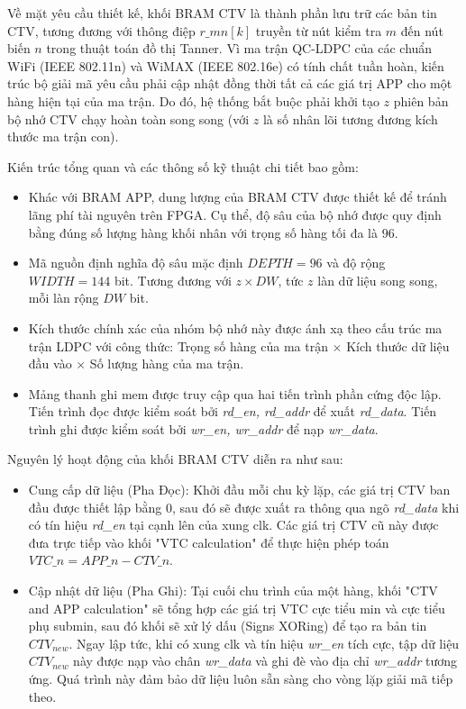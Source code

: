 \documentclass[12pt,a4paper,oneside]{book}
\begin{document}
Về mặt yêu cầu thiết kế, khối BRAM CTV là thành phần lưu trữ các bản tin CTV, tương đương với thông điệp $r\_{mn}[k]$ truyền từ nút kiểm tra $m$ đến nút biến $n$ trong thuật toán đồ thị Tanner. Vì ma trận QC-LDPC của các chuẩn WiFi (IEEE 802.11n) và WiMAX (IEEE 802.16e) có tính chất tuần hoàn, kiến trúc bộ giải mã yêu cầu phải cập nhật đồng thời tất cả các giá trị APP cho một hàng hiện tại của ma trận. Do đó, hệ thống bắt buộc phải khởi tạo $z$ phiên bản bộ nhớ CTV chạy hoàn toàn song song (với $z$ là số nhân lõi tương đương kích thước ma trận con).  

Kiến trúc tổng quan và các thông số kỹ thuật chi tiết bao gồm:
\begin{itemize}
    \item Khác với BRAM APP, dung lượng của BRAM CTV được thiết kế để tránh lãng phí tài nguyên trên FPGA. Cụ thể, độ sâu của bộ nhớ được quy định bằng đúng số lượng hàng khối nhân với trọng số hàng tối đa là $96$.
    \item Mã nguồn định nghĩa độ sâu mặc định $DEPTH = 96$ và độ rộng $WIDTH = 144$ bit. Tương đương với $z \times DW$, tức $z$ làn dữ liệu song song, mỗi làn rộng $DW$ bit.
    \item Kích thước chính xác của nhóm bộ nhớ này được ánh xạ theo cấu trúc ma trận LDPC với công thức: Trọng số hàng của ma trận $\times$ Kích thước dữ liệu đầu vào $\times$ Số lượng hàng của ma trận.
    \item Mảng thanh ghi mem được truy cập qua hai tiến trình phần cứng độc lập. Tiến trình đọc được kiểm soát bởi \textit{rd\_en, rd\_addr} để xuất \textit{rd\_data}. Tiến trình ghi được kiểm soát bởi \textit{wr\_en, wr\_addr} để nạp \textit{wr\_data}. 
\end{itemize}

Nguyên lý hoạt động của khối BRAM CTV diễn ra như sau:
\begin{itemize}
    \item Cung cấp dữ liệu (Pha Đọc): Khởi đầu mỗi chu kỳ lặp, các giá trị CTV ban đầu được thiết lập bằng 0, sau đó sẽ được xuất ra thông qua ngõ \textit{rd\_data} khi có tín hiệu \textit{rd\_en} tại cạnh lên của xung clk. Các giá trị CTV cũ này được đưa trực tiếp vào khối "VTC calculation" để thực hiện phép toán $VTC\_n = APP\_n - CTV\_n$.
    \item Cập nhật dữ liệu (Pha Ghi): Tại cuối chu trình của một hàng, khối "CTV and APP calculation" sẽ tổng hợp các giá trị VTC cực tiểu min và cực tiểu phụ submin, sau đó khối sẽ xử lý dấu (Signs XORing) để tạo ra bản tin $CTV_{new}$. Ngay lập tức, khi có xung clk và tín hiệu \textit{wr\_en} tích cực, tập dữ liệu $CTV_{new}$ này được nạp vào chân \textit{wr\_data} và ghi đè vào địa chỉ \textit{wr\_addr} tương ứng. Quá trình này đảm bảo dữ liệu luôn sẵn sàng cho vòng lặp giải mã tiếp theo.
\end{itemize}
\end{document}

